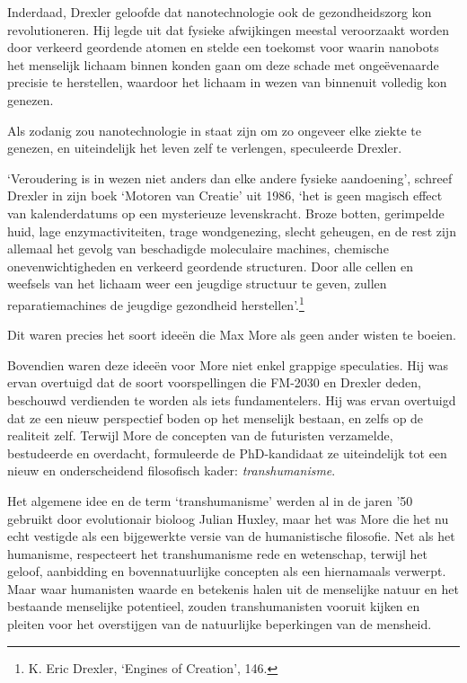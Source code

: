 \documentclass[
  a5paper,
  smalldemyvopaper,11pt,twoside,onecolumn,openright,extrafontsizes]{memoir}
\begin{document}
Inderdaad, Drexler geloofde dat nanotechnologie ook de gezondheidszorg
kon revolutioneren. Hij legde uit dat fysieke afwijkingen meestal
veroorzaakt worden door verkeerd geordende atomen en stelde een toekomst
voor waarin nanobots het menselijk lichaam binnen konden gaan om deze
schade met ongeëvenaarde precisie te herstellen, waardoor het lichaam in
wezen van binnenuit volledig kon genezen.

Als zodanig zou nanotechnologie in staat zijn om zo ongeveer elke ziekte
te genezen, en uiteindelijk het leven zelf te verlengen, speculeerde
Drexler.

`Veroudering is in wezen niet anders dan elke andere fysieke
aandoening', schreef Drexler in zijn boek `Motoren van Creatie' uit
1986, `het is geen magisch effect van kalenderdatums op een mysterieuze
levenskracht. Broze botten, gerimpelde huid, lage enzymactiviteiten,
trage wondgenezing, slecht geheugen, en de rest zijn allemaal het gevolg
van beschadigde moleculaire machines, chemische onevenwichtigheden en
verkeerd geordende structuren. Door alle cellen en weefsels van het
lichaam weer een jeugdige structuur te geven, zullen reparatiemachines
de jeugdige gezondheid herstellen'.\footnote{K. Eric Drexler, `Engines
  of Creation', 146.}

Dit waren precies het soort ideeën die Max More als geen ander wisten te
boeien.

Bovendien waren deze ideeën voor More niet enkel grappige speculaties.
Hij was ervan overtuigd dat de soort voorspellingen die FM-2030 en
Drexler deden, beschouwd verdienden te worden als iets fundamentelers.
Hij was ervan overtuigd dat ze een nieuw perspectief boden op het
menselijk bestaan, en zelfs op de realiteit zelf. Terwijl More de
concepten van de futuristen verzamelde, bestudeerde en overdacht,
formuleerde de PhD-kandidaat ze uiteindelijk tot een nieuw en
onderscheidend filosofisch kader: \emph{transhumanisme}.

Het algemene idee en de term `transhumanisme' werden al in de jaren '50
gebruikt door evolutionair bioloog Julian Huxley, maar het was More die
het nu echt vestigde als een bijgewerkte versie van de humanistische
filosofie. Net als het humanisme, respecteert het transhumanisme rede en
wetenschap, terwijl het geloof, aanbidding en bovennatuurlijke concepten
als een hiernamaals verwerpt. Maar waar humanisten waarde en betekenis
halen uit de menselijke natuur en het bestaande menselijke potentieel,
zouden transhumanisten vooruit kijken en pleiten voor het overstijgen
van de natuurlijke beperkingen van de mensheid.
\end{document}
